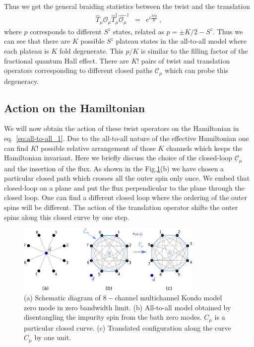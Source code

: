 \documentclass[reprint,onecolumn,prb,superscriptaddress]{revtex4-2}
\begin{document}
Thus we get the general braiding statistics between the twist and the translation 
\begin{eqnarray}
\hat{T}_{\mu}\hat{\mathcal{O}_{\mu}} \hat{T}^{\dagger}_{\mu}\hat{\mathcal{O}_{\mu}}^{\dagger} &=& e^{i\frac{2\pi p}{K}}~,
\end{eqnarray}
where $p$ corresponds to different $S^z$ states, related as $p=\pm K/2-S^z$. Thus we can see that there are $K$ possible $S^z$ plateau states in the all-to-all model where each plateau is $K$ fold degenerate. This $p/K$ is similar to the filling factor of the fractional quantum Hall effect. There are $K!$ pairs of twist and translation operators corresponding to different closed paths $\mathcal{C}_{\mu}$ which can probe this degeneracy.

\subsection{Action on the Hamiltonian}
We will now obtain the action of these twist operators on the Hamiltonian in eq.~\ref{eq:all-to-all_1}. Due to the all-to-all nature of the effective Hamiltonian one can find $K!$ possible relative arrangement of those $K$ channels which keeps the Hamiltonian invariant. Here we briefly discuss the choice of the closed-loop $\mathcal{C}_{\mu}$ and the insertion of the flux. As shown in the {\color{blue}Fig.\ref{fig:stargraph-to-alltoall}(b)} we have chosen a particular closed path which crosses all the outer spin only once. We embed that closed-loop on a plane and put the flux perpendicular to the plane through the closed loop. One can find a different closed loop where the ordering of the outer spins will be different. The action of the translation operator shifts the outer spins along this closed curve by one step.

\begin{figure}[htpb]
	\centering
	\includegraphics[width=0.8\textwidth]{plt/stargraph-to-alltoall.png}
	\caption{(a) Schematic diagram of $8-$channel multichannel Kondo model zero mode in zero bandwidth limit. (b) All-to-all model obtained by disentangling the impurity spin from the bath zero modes. $C_{\mu}$ is a particular closed curve. (c) Translated configuration along the curve $C_{\mu}$ by one unit.}
	\label{fig:stargraph-to-alltoall}
\end{figure}
\end{document}
